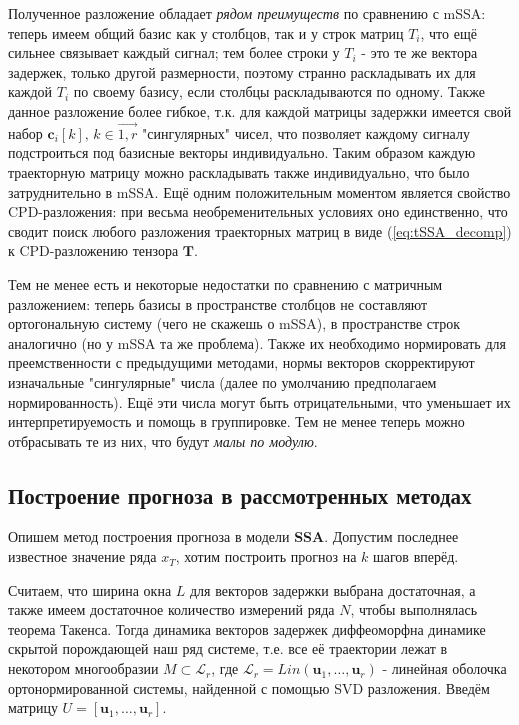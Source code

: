 			 Полученное разложение обладает \textit{рядом преимуществ} по сравнению с mSSA: теперь имеем общий базис как у столбцов, так и у строк матриц $ T_i $, что ещё сильнее связывает каждый сигнал; тем более строки у $ T_i $ - это те же вектора задержек, только другой размерности, поэтому странно раскладывать их для каждой $ T_i $ по своему базису, если столбцы раскладываются по одному. Также данное разложение более гибкое, т.к. для каждой матрицы задержки имеется свой набор $ \mathbf{c}_i[k], \,  k \in \overrightarrow{1, r} $ "сингулярных" чисел, что позволяет каждому сигналу подстроиться под базисные векторы индивидуально. Таким образом каждую траекторную матрицу можно раскладывать также индивидуально, что было затруднительно в mSSA. Ещё одним положительным моментом является свойство CPD-разложения: при весьма необременительных условиях оно единственно, что сводит поиск любого разложения траекторных матриц в виде (\ref{eq:tSSA_decomp}) к CPD-разложению тензора $ \mathbf{T} $.
			 
			 
			 Тем не менее есть и некоторые недостатки по сравнению с матричным разложением: теперь базисы в пространстве столбцов не составляют ортогональную систему (чего не скажешь о mSSA), в пространстве строк аналогично (но у mSSA та же проблема). Также их необходимо нормировать для преемственности с предыдущими методами, нормы векторов скорректируют изначальные "сингулярные" числа (далее по умолчанию предполагаем нормированность). Ещё эти числа могут быть отрицательными, что уменьшает их интерпретируемость и помощь в группировке. Тем не менее теперь можно отбрасывать те из них, что будут \textit{малы по модулю}.
			 
			 
			 \subsection*{Построение прогноза в рассмотренных методах}
			 
			 Опишем метод построения прогноза в модели \textbf{SSA}. Допустим последнее известное значение ряда $ x_T $, хотим построить прогноз на $ k $ шагов вперёд.
			 
			 Считаем, что ширина окна $ L $ для векторов задержки выбрана достаточная, а также имеем достаточное количество измерений ряда $ N $, чтобы выполнялась теорема Такенса. Тогда динамика векторов задержек диффеоморфна динамике скрытой порождающей наш ряд системе, т.е. все её траектории лежат в некотором многообразии $ M \subset \mathcal{L}_r $, где $ \mathcal{L}_r = Lin(\mathbf{u}_1, \ldots, \mathbf{u}_r) $ - линейная оболочка ортонормированной системы, найденной с помощью SVD разложения. Введём матрицу $ U = [\mathbf{u}_1, \ldots, \mathbf{u}_r] $.
			 
